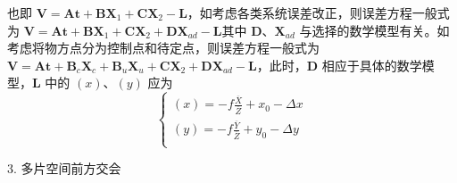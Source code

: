 \documentclass[a4paper]{ctexart}
\begin{document}
也即 $\boldsymbol{V}=\boldsymbol{At}+\boldsymbol{BX}_1+\boldsymbol{CX}_2-\boldsymbol{L}$，如考虑各类系统误差改正，则误差方程一般式为 $\boldsymbol{V}=\boldsymbol{At}+\boldsymbol{BX}_1+\boldsymbol{CX}_2+\boldsymbol{DX}_{ad}-\boldsymbol{L}$其中 $\bm{D}$、$\bm{X}_{ad}$ 与选择的数学模型有关。如考虑将物方点分为控制点和待定点，则误差方程一般式为 $\boldsymbol{V}=\boldsymbol{At}+\boldsymbol{B}_c\boldsymbol{X}_c+\boldsymbol{B}_u\boldsymbol{X}_u+\boldsymbol{CX}_2+\boldsymbol{DX}_{ad}-\boldsymbol{L}$，此时，$\bm{D}$ 相应于具体的数学模型，$\bm{L}$ 中的 $(x)$、$(y)$ 应为
$$
\begin{cases}
	\left( x \right) =-f\frac{\overline{X}}{\overline{Z}}+x_0-\Delta x\\
	\left( y \right) =-f\frac{\overline{Y}}{\overline{Z}}+y_0-\Delta y\\
\end{cases}
$$

3. 多片空间前方交会
\end{document}
